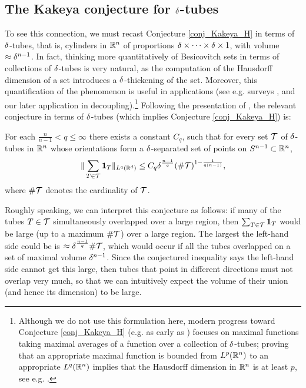 \documentclass[brochure,english,12pt]{bourbaki}%
\begin{document}
\subsection{The Kakeya conjecture for $\delta$-tubes}
To see this connection, we must recast Conjecture \ref{conj_Kakeya_H} in terms of $\delta$-tubes, that is, cylinders in $\mathbb{R}^n$ of proportions $\delta \times \cdots \times \delta \times 1$, with volume $\approx \delta^{n-1}$. 
In fact, thinking more quantitatively of Besicovitch sets in terms of collections of $\delta$-tubes is very natural, as the computation of the Hausdorff dimension of a set introduces a $\delta$-thickening of the set. Moreover, this quantification of the phenomenon  is useful in applications (see e.g. surveys \cite{KatTao02}, \cite{Tao01} and our later application in decoupling).\footnote{Although we do not use this formulation here, modern progress toward Conjecture \ref{conj_Kakeya_H} (e.g. as early as \cite{Bou91,Wol95}) focuses  on maximal functions taking maximal averages of a function over a collection of $\delta$-tubes; proving that an appropriate maximal function is bounded from $L^p(\mathbb{R}^n)$ to an appropriate $L^q(\mathbb{R}^n)$ implies that the Hausdorff dimension in $\mathbb{R}^n$ is at least $p$, see e.g. \cite[Ch. 10]{Wol03}.}
Following the presentation of \cite{BCT06}, the relevant conjecture in terms of $\delta$-tubes (which implies Conjecture \ref{conj_Kakeya_H}) is:

\begin{conj}\label{conj_Kakeya_linear}
For each $\frac{n}{n-1}< q \leq \infty$ there exists a constant $C_q$, such that for every set $\mathcal{T}$ of $\delta$-tubes in $\mathbb{R}^n$ whose orientations form a $\delta$-separated set of points on $S^{n-1} \subset \mathbb{R}^n$, 
\[  \| \sum_{T \in \mathcal{T}} \boldsymbol1_T \|_{L^q(\mathbb{R}^d)} \leq C_q \delta^{\frac{n-1}{q}} (\# \mathcal{T})^{1  - \frac{1}{q(n-1)}},\]
where $\#\mathcal{T}$ denotes the cardinality of $\mathcal{T}$.
\end{conj}

Roughly speaking, we can interpret this conjecture as follows: if many of the tubes $T \in \mathcal{T}$ simultaneously overlapped over a large region, then  $\sum_{T \in \mathcal{T}} \boldsymbol1_T$ would be large (up to a maximum $\# \mathcal{T}$) over a large region. The largest the left-hand side could be is $\approx \delta^{\frac{n-1}{q}} \# \mathcal{T}$, which would occur if all the tubes overlapped on a set of maximal volume $\delta^{n-1}$.  Since the conjectured inequality says the left-hand side cannot get this large, then  tubes that point in different directions must not overlap very much, so that we can intuitively expect the volume of their union (and hence its dimension) to be large.
\end{document}
